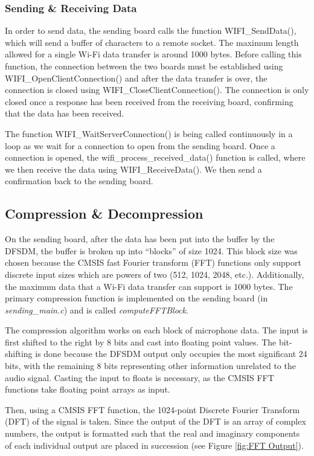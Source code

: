 \documentclass[journal]{IEEEtran}
\begin{document}
\vspace{10pt}
\subsubsection{Sending \& Receiving Data}
In order to send data, the sending board calls the function WIFI\_SendData(), which will send a buffer of characters to a remote socket. The maximum length allowed for a single Wi-Fi data transfer is around 1000 bytes. Before calling this function, the connection between the two boards must be established using WIFI\_OpenClientConnection() and after the data transfer is over, the connection is closed using WIFI\_CloseClientConnection(). The connection is only closed once a response has been received from the receiving board, confirming that the data has been received.

The function WIFI\_WaitServerConnection() is being called continuously in a loop as we wait for a connection to open from the sending board. Once a connection is opened, the wifi\_process\_received\_data() function is called, where we then receive the data using WIFI\_ReceiveData(). We then send a confirmation back to the sending board.

\subsection{Compression \& Decompression}
On the sending board, after the data has been put into the buffer by the DFSDM, the buffer is broken up into “blocks” of size 1024. This block size was chosen because the CMSIS fast Fourier transform (FFT) functions only support discrete input sizes which are powers of two (512, 1024, 2048, etc.). Additionally, the maximum data that a Wi-Fi data transfer can support is 1000 bytes. The primary compression function is implemented on the sending board (in \textit{sending\_main.c}) and is called \textit{computeFFTBlock}.

The compression algorithm works on each block of microphone data. The input is first shifted to the right by 8 bits and cast into floating point values. The bit-shifting is done because the DFSDM output only occupies the most significant 24 bits, with the remaining 8 bits representing other information unrelated to the audio signal. Casting the input to floats is necessary, as the CMSIS FFT functions take floating point arrays as input. 

Then, using a CMSIS FFT function, the 1024-point Discrete Fourier Transform (DFT) of the signal is taken. Since the output of the DFT is an array of complex numbers, the output is formatted such that the real and imaginary components of each individual output are placed in succession (see Figure \ref{fig:FFT Output}).
\end{document}
